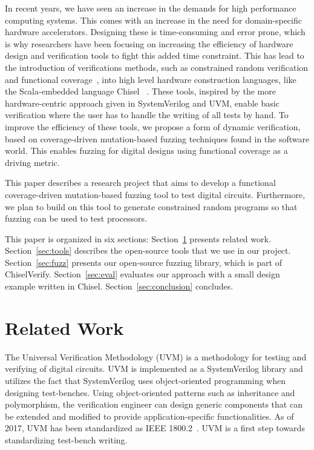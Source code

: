 \documentclass[conference]{IEEEtran}
\begin{document}
In recent years, we have seen an increase in the demands for high performance computing systems.  
This comes with an increase in the need for domain-specific hardware accelerators.  
Designing these is time-consuming and error prone, which is why researchers have been focusing on increasing the efficiency of hardware design and verification tools to fight this added time constraint.
This has lead to the introduction of verifications methods, such as constrained random verification and functional coverage~\cite{verify:chisel:2020, dobis2021opensource}, into high level hardware construction languages, like the Scala-embedded language Chisel~\cite{chisel:dac2012, chisel:book} .
These tools, inspired by the more hardware-centric approach given in SystemVerilog and UVM, enable basic verification where the user has to handle the writing of all tests by hand.
To improve the efficiency of these tools, we propose a form of dynamic verification, based on coverage-driven mutation-based fuzzing techniques found in the software world.
This enables fuzzing for digital designs using functional coverage as a driving metric.

This paper describes a research project that aims to develop a functional coverage-driven mutation-based fuzzing tool to test digital circuits.
Furthermore, we plan to build on this tool to generate constrained random programs so that fuzzing can be used to test processors.

This paper is organized in six sections: %
Section~\ref{sec:related}  presents related work.
Section~\ref{sec:tools} describes the open-source tools that we use in our project.
Section~\ref{sec:fuzz} presents our open-source fuzzing library, which is part of ChiselVerify.
Section~\ref{sec:eval} evaluates our approach with a small design example written in Chisel.
Section~\ref{sec:conclusion} concludes.


\section{Related Work}
\label{sec:related}

The Universal Verification Methodology (UVM) is a methodology for testing and verifying of digital circuits.
UVM is implemented as a SystemVerilog library and utilizes the fact that SystemVerilog uses object-oriented programming when designing test-benches.
Using object-oriented patterns such as inheritance and polymorphism, the verification engineer can design generic components that can be extended and modified to provide application-specific functionalities.
As of 2017, UVM has been standardized as IEEE 1800.2~\cite{IEEE:18002}.
UVM is a first step towards standardizing test-bench writing.
\end{document}
